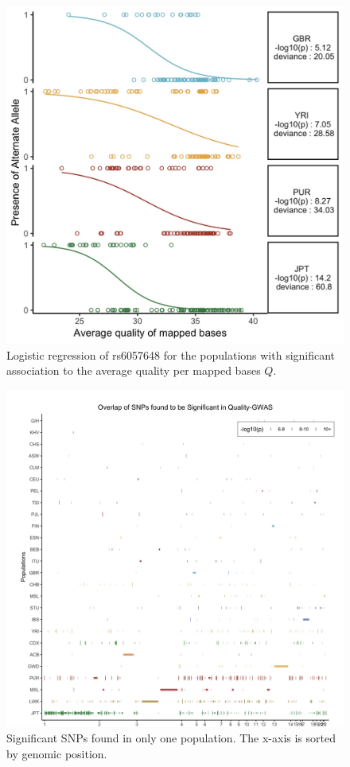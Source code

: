 \documentclass[9pt,lineno]{elife}
\begin{document}
\begin{figure}
\includegraphics[width=\hsize,keepaspectratio]{./Figures/RegressionPlot.jpg}
\caption{Logistic regression of rs6057648 for the populations with significant association to the average quality per mapped bases $Q$.}
\label{TwinsSNP}
\end{figure}

\begin{figure}
\includegraphics[width=\hsize,keepaspectratio]{./Figures/SNP6_Singles.jpg}
\caption{Significant SNPs found in only one population. The x-axis is sorted by genomic position.}
\label{Singles}
\end{figure}
\end{document}
